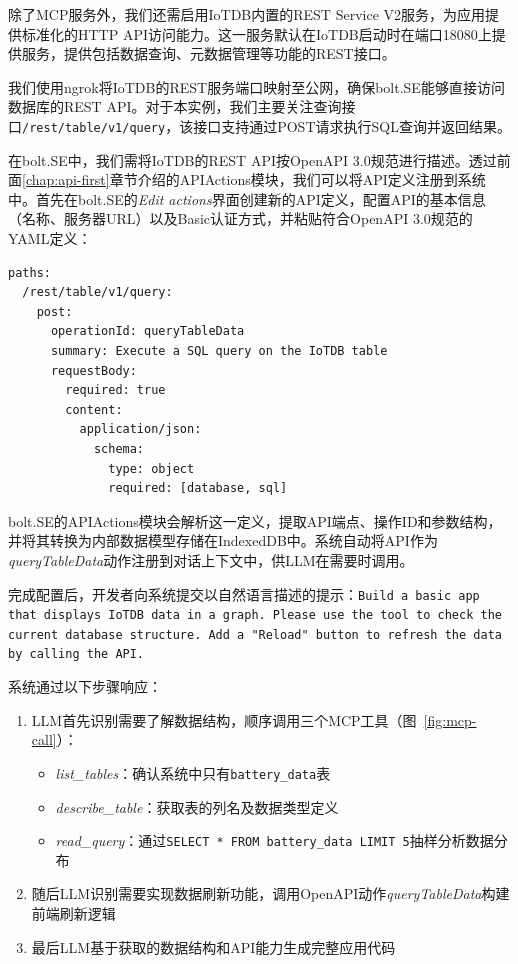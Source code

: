 除了MCP服务外，我们还需启用IoTDB内置的REST Service V2\cite{IoTDBRestV2}服务，为应用提供标准化的HTTP API访问能力。这一服务默认在IoTDB启动时在端口18080上提供服务，提供包括数据查询、元数据管理等功能的REST接口。

我们使用ngrok将IoTDB的REST服务端口映射至公网，确保bolt.SE能够直接访问数据库的REST API。对于本实例，我们主要关注查询接口\verb|/rest/table/v1/query|，该接口支持通过POST请求执行SQL查询并返回结果。

在bolt.SE中，我们需将IoTDB的REST API按OpenAPI 3.0规范进行描述。透过前面\ref{chap:api-first}章节介绍的APIActions模块，我们可以将API定义注册到系统中。首先在bolt.SE的\textit{Edit actions}界面创建新的API定义，配置API的基本信息（名称、服务器URL）以及Basic认证方式，并粘贴符合OpenAPI 3.0规范的YAML定义：

\begin{verbatim}
paths:
  /rest/table/v1/query:
    post:
      operationId: queryTableData
      summary: Execute a SQL query on the IoTDB table
      requestBody:
        required: true
        content:
          application/json:
            schema:
              type: object
              required: [database, sql]
\end{verbatim}

bolt.SE的APIActions模块会解析这一定义，提取API端点、操作ID和参数结构，并将其转换为内部数据模型存储在IndexedDB中。系统自动将API作为\textit{queryTableData}动作注册到对话上下文中，供LLM在需要时调用。

完成配置后，开发者向系统提交以自然语言描述的提示：\texttt{Build a basic app that displays IoTDB data in a graph. Please use the tool to check the current database structure. Add a "Reload" button to refresh the data by calling the API.}


系统通过以下步骤响应：

\begin{enumerate}
  \item LLM首先识别需要了解数据结构，顺序调用三个MCP工具（图~\ref{fig:mcp-call}）：
    \begin{itemize}
      \item \textit{list\_tables}：确认系统中只有\texttt{battery\_data}表
      \item \textit{describe\_table}：获取表的列名及数据类型定义
      \item \textit{read\_query}：通过\verb|SELECT * FROM battery_data LIMIT 5|抽样分析数据分布
    \end{itemize}
  
  \item 随后LLM识别需要实现数据刷新功能，调用OpenAPI动作\textit{queryTableData}构建前端刷新逻辑
  
  \item 最后LLM基于获取的数据结构和API能力生成完整应用代码
\end{enumerate}

